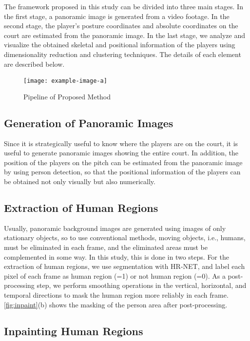 
The framework proposed in this study can be divided into three main stages. In the first stage, a panoramic image is generated from a video footage. In the second stage, the player's posture coordinates and absolute coordinates on the court are estimated from the panoramic image. In the last stage, we analyze and visualize the obtained skeletal and positional information of the players using dimensionality reduction and clustering techniques. The details of each element are described below.

\begin{figure}[hb]
	\texttt{[image: example-image-a]}
	\caption{Pipeline of Proposed Method}
	\label{homo}
\end{figure}

\newpage

\subsection{Generation of Panoramic Images}
Since it is strategically useful to know where the players are on the court, it is useful to generate panoramic images showing the entire court. In addition, the position of the players on the pitch can be estimated from the panoramic image by using person detection, so that the positional information of the players can be obtained not only visually but also numerically.

\subsection{Extraction of Human Regions}

Usually, panoramic background images are generated using images of only stationary objects, so to use conventional methods, moving objects, i.e., humans, must be eliminated in each frame, and the eliminated areas must be complemented in some way. In this study, this is done in two steps.
For the extraction of human regions, we use segmentation with HR-NET\cite{SunXLW19}, and label each pixel of each frame as human region (=1) or not human region (=0). As a post-processing step, we perform smoothing operations in the vertical, horizontal, and temporal directions to mask the human region more reliably in each frame. \ref{fig:inpaint}(b) shows the masking of the person area after post-processing.

\subsection{Inpainting Human Regions}

